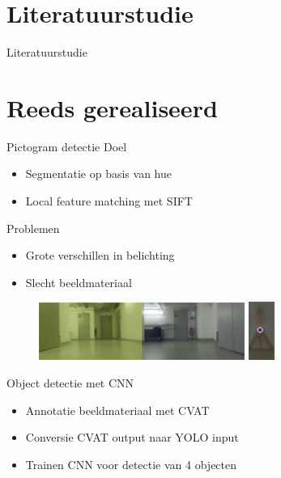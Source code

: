 \documentclass[11pt,t]{beamer}
\begin{document}
 \section{Literatuurstudie}
 \begin{frame}[fragile]{Literatuurstudie}
 \end{frame}




\section{Reeds gerealiseerd}
\begin{frame}[fragile]{Pictogram detectie}
	Doel
	\begin{itemize}
		\item Segmentatie op basis van hue
		\item Local feature matching met SIFT
	\end{itemize}

	Problemen
	\begin{itemize}
		\item Grote verschillen in belichting
		\item Slecht beeldmateriaal
	\end{itemize}

	\begin{figure}
		\centering
		\includegraphics[width=0.6\textwidth]{graphics/kleurverschil.png}
		\includegraphics{graphics/sift_detectie.png}
		\flushleft
	\end{figure}
\end{frame}

\begin{frame}[fragile]{Object detectie met CNN}
	\begin{itemize}
		\item Annotatie beeldmateriaal met CVAT
		\item Conversie CVAT output naar YOLO input
		\item Trainen CNN voor detectie van 4 objecten
	\end{itemize}
\end{frame}
\end{document}
